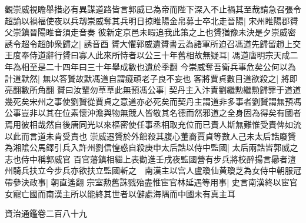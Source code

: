 觀崇威視瞻舉措必有異謀道路皆言郭威已為帝而陛下深入不止禍其至哉請急召張令超諭以禍福使夜以兵刼崇威奪其兵明日掠睢陽金帛募士卒北走晉陽|{
	宋州睢陽郡贇父崇鎮晉陽睢音須走音奏}
彼新定京邑未暇追我此策之上也贇猶豫未決是夕崇威密誘令超令超帥衆歸之|{
	誘音酉}
贇大懼郭威遺贇書云為諸軍所迫召馮道先歸留趙上交王度奉侍道辭行贇曰寡人此來所恃者以公三十年舊相故無疑耳|{
	馮道唐明宗天成二年為相至是二十四年曰三十年舉成數也遺於季翻}
今崇威奪吾衛兵事危矣公何以為計道默然|{
	無以答贇故默馮道自謂癡頑老子良不妄也}
客將賈貞數目道欲殺之|{
	將即亮翻數所角翻}
贇曰汝輩勿草草此無預馮公事|{
	契丹主入汴責劉繼勲繼勲歸罪于道道幾死矣宋州之事使劉贇從賈貞之意道亦必死矣而契丹主謂道非多事者劉贇謂無預馮公事豈非以其在位素懷沖澹與物無競人皆敬其名德而然邪道之全身固為得矣有國者焉用彼相哉然自後唐同光以來樞密使任事丞相取充位而已責人斯無難惟受責俾如流以此而言道未肯受責也}
崇威遷贇於外館殺其腹心董裔賈貞等數人己未太后誥廢贇為湘隂公馬鐸引兵入許州劉信惶惑自殺庚申太后誥以侍中監國|{
	太后兩誥皆郭威之志也侍中稱郭威官}
百官藩鎮相繼上表勸進壬戌夜監國營有步兵將校醉揚言曏者澶州騎兵扶立今步兵亦欲扶立監國斬之　南漢主以宫人盧瓊仙黄瓊芝為女侍中朝服冠帶參決政事|{
	朝直遙翻}
宗室勲舊誅戮殆盡惟宦官林延遇等用事|{
	史言南漢終以宦官女寵亡國而南漢主所以能終其世者以僻處海隅而中國未有真主耳}


資治通鑑卷二百八十九
